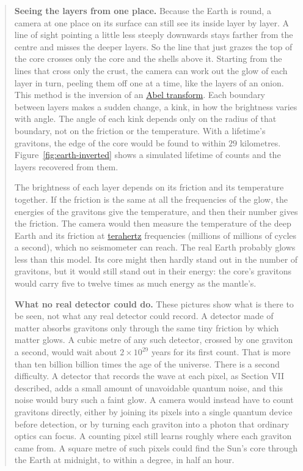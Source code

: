 \begin{quote}
\textbf{Seeing the layers from one place.} Because the Earth is round, a camera at
one place on its surface can still see its inside layer by layer. A line of
sight pointing a little less steeply downwards stays farther from the centre and
misses the deeper layers. So the line that just grazes the top of the core
crosses only the core and the shells above it. Starting from the lines that
cross only the crust, the camera can work out the glow of each layer in turn,
peeling them off one at a time, like the layers of an onion. This method is the
inversion of an
\href{https://en.wikipedia.org/wiki/Abel_transform}{Abel transform}. Each
boundary between layers makes a sudden change, a kink, in how the brightness
varies with angle. The angle of each kink depends only on the radius of that
boundary, not on the friction or the temperature. With a lifetime's gravitons,
the edge of the core would be found to within $29$ kilometres. Figure~\ref{fig:earth-inverted} shows a simulated lifetime of counts and the layers recovered from them.

The brightness of each layer depends on its friction and its temperature
together. If the friction is the same at all the frequencies of the glow, the
energies of the gravitons give the temperature, and then their number gives the
friction. The camera would then measure the temperature of the deep Earth and
its friction at
\href{https://en.wikipedia.org/wiki/Terahertz_radiation}{terahertz}
frequencies (millions of millions of cycles a second), which no seismometer can
reach. The real Earth probably glows less than this model. Its core might then
hardly stand out in the number of gravitons, but it would still stand out in
their energy: the core's gravitons would carry five to twelve times as much
energy as the mantle's.

\textbf{What no real detector could do.} These pictures show what is there to be
seen, not what any real detector could record. A detector made of matter
absorbs gravitons only through the same tiny friction by which matter glows. A
cubic metre of any such detector, crossed by one graviton a second, would wait
about $2\times10^{29}$ years for its first count. That is more than ten billion
billion times the age of the universe. There is a second difficulty. A detector
that records the wave at each pixel, as Section VII described, adds a small
amount of unavoidable quantum noise, and this noise would bury such a faint
glow. A camera would instead have to count gravitons directly, either by
joining its pixels into a single quantum device before detection, or by
turning each graviton into a photon that ordinary optics can focus. A counting
pixel still learns roughly where each graviton came from. A square metre of
such pixels could find the Sun's core through the Earth at midnight, to within
a degree, in half an hour.
\end{quote}

